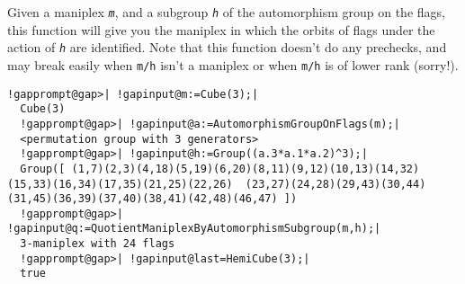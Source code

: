 \documentclass[a4paper,11pt]{report}
\begin{document}
{{{ Given a maniplex \mbox{\texttt{\mdseries\slshape m}}, and a subgroup \mbox{\texttt{\mdseries\slshape h}} of the automorphism group on the flags, this function will give you the
maniplex in which the orbits of flags under the action of \mbox{\texttt{\mdseries\slshape h}} are identified. Note that this function doesn't do any prechecks, and may
break easily when \texttt{m/h} {\textunderscore}isn't{\textunderscore} a maniplex or when \texttt{m/h} is of lower rank (sorry!). }

 
\begin{Verbatim}[commandchars=!@|,fontsize=\small,frame=single,label=Example]
  !gapprompt@gap>| !gapinput@m:=Cube(3);|
  Cube(3)
  !gapprompt@gap>| !gapinput@a:=AutomorphismGroupOnFlags(m);|
  <permutation group with 3 generators>
  !gapprompt@gap>| !gapinput@h:=Group((a.3*a.1*a.2)^3);|
  Group([ (1,7)(2,3)(4,18)(5,19)(6,20)(8,11)(9,12)(10,13)(14,32)(15,33)(16,34)(17,35)(21,25)(22,26)  (23,27)(24,28)(29,43)(30,44)(31,45)(36,39)(37,40)(38,41)(42,48)(46,47) ])
  !gapprompt@gap>| !gapinput@q:=QuotientManiplexByAutomorphismSubgroup(m,h);|
  3-maniplex with 24 flags
  !gapprompt@gap>| !gapinput@last=HemiCube(3);|
  true
\end{Verbatim}
 }

 }

   
\end{document}
